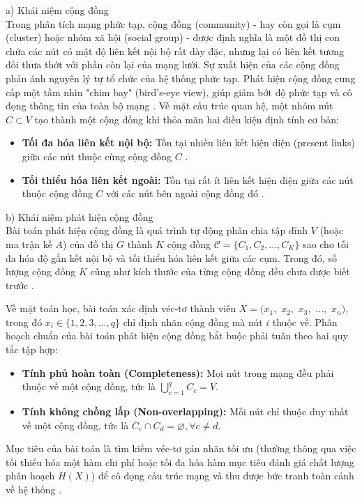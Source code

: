 \documentclass[14pt,a4paper]{extarticle}
\begin{document}
\noindent a) Khái niệm cộng đồng \\
Trong phân tích mạng phức tạp, cộng đồng (community) - hay còn gọi là cụm (cluster) hoặc nhóm xã hội (social group) - được định nghĩa là một đồ thị con chứa các nút có mật độ liên kết nội bộ rất dày đặc, nhưng lại có liên kết tương đối thưa thớt với phần còn lại của mạng lưới. Sự xuất hiện của các cộng đồng phản ánh nguyên lý tự tổ chức của hệ thống phức tạp. Phát hiện cộng đồng cung cấp một tầm nhìn "chim bay" (bird's-eye view), giúp giảm bớt độ phức tạp và cô đọng thông tin của toàn bộ mạng \cite{Traag2014}. Về mặt cấu trúc quan hệ, một nhóm nút $C \subset V$ tạo thành một cộng đồng khi thỏa mãn hai điều kiện định tính cơ bản:
\begin{itemize}
    \item \textbf{Tối đa hóa liên kết nội bộ:} Tồn tại nhiều liên kết hiện diện (present links) giữa các nút thuộc cùng cộng đồng $C$ \cite{Traag2014}.
    \item \textbf{Tối thiểu hóa liên kết ngoài:} Tồn tại rất ít liên kết hiện diện giữa các nút thuộc cộng đồng $C$ với các nút bên ngoài cộng đồng đó \cite{Traag2014}.
\end{itemize}


\noindent b) Khái niệm phát hiện cộng đồng \\
Bài toán phát hiện cộng đồng là quá trình tự động phân chia tập đỉnh $V$ (hoặc ma trận kề $A$) của đồ thị $G$ thành $K$ cộng đồng $\mathcal{C} = \{C_1, C_2, \dots, C_K\}$ sao cho tối đa hóa độ gắn kết nội bộ và tối thiểu hóa liên kết giữa các cụm. Trong đó, số lượng cộng đồng $K$ cũng như kích thước của từng cộng đồng đều chưa được biết trước \cite{Baraa2021}. 

Về mặt toán học, bài toán xác định véc-tơ thành viên $X = (x_1,$ $x_2,$ $x_3,$ $\dots,$ $x_n)$, trong đó $x_i \in \{1, 2, 3, \dots, q\}$ chỉ định nhãn cộng đồng mà nút $i$ thuộc về. Phân hoạch chuẩn của bài toán phát hiện cộng đồng bắt buộc phải tuân theo hai quy tắc tập hợp:
\begin{itemize}
    \item \textbf{Tính phủ hoàn toàn (Completeness):} Mọi nút trong mạng đều phải thuộc về một cộng đồng, tức là $\bigcup_{c=1}^{q} C_c = V$.
    \item \textbf{Tính không chồng lấp (Non-overlapping):} Mỗi nút chỉ thuộc duy nhất về một cộng đồng, tức là $C_c \cap C_d = \varnothing, \forall c \neq d$.
\end{itemize}
Mục tiêu của bài toán là tìm kiếm véc-tơ gán nhãn tối ưu (thường thông qua việc tối thiểu hóa một hàm chi phí hoặc tối đa hóa hàm mục tiêu đánh giá chất lượng phân hoạch $H(X)$) để cô đọng cấu trúc mạng và thu được bức tranh toàn cảnh về hệ thống \cite{Traag2014}.
\end{document}

